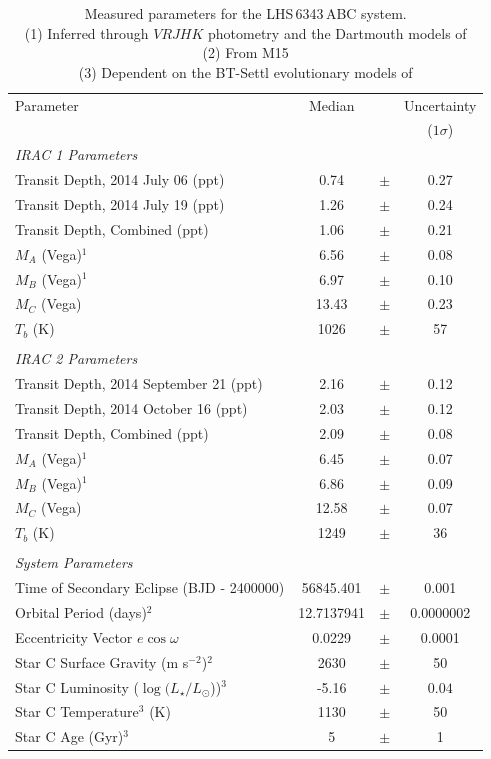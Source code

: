 \begin{table}[hbt!]
\centering
\begin{tabular}{lccc}
\hline
\footnotesize
Parameter & Median    & & Uncertainty \\
 & & & ($1\sigma$) \\
\hline
\textit{IRAC 1 Parameters}\\
Transit Depth, 2014 July 06 (ppt) & 0.74 & $\pm$ & 0.27 \\
Transit Depth, 2014 July 19 (ppt) & 1.26 & $\pm$ & 0.24 \\
Transit Depth, Combined (ppt) & 1.06 & $\pm$ & 0.21 \\
$M_A$ (Vega)$^1$ & 6.56  & $\pm$ & 0.08 \\
$M_B$ (Vega)$^1$ & 6.97 & $\pm$ & 0.10 \\
$M_C$ (Vega)& 13.43 & $\pm$ & 0.23 \\
$T_b$ (K) & 1026 & $\pm$ & 57 \\
\\
\textit{IRAC 2 Parameters}\\
Transit Depth, 2014 September 21 (ppt) & 2.16 &$\pm$  & 0.12 \\
Transit Depth, 2014 October 16 (ppt) & 2.03 & $\pm$ & 0.12 \\
Transit Depth, Combined (ppt) & 2.09 & $\pm$ & 0.08 \\
$M_A$ (Vega)$^1$ & 6.45  & $\pm$ & 0.07 \\
$M_B$ (Vega)$^1$ & 6.86 & $\pm$ & 0.09 \\
$M_C$ (Vega) & 12.58 & $\pm$ & 0.07 \\
$T_b$ (K) & 1249 & $\pm$ & 36 \\
\\
\textit{System Parameters} \\
Time of Secondary Eclipse (BJD - 2400000) & 56845.401 & $\pm$ & 0.001 \\
Orbital Period (days)$^2$ &  12.7137941 & $\pm$ & 0.0000002 \\
Eccentricity Vector $e \cos \omega$ & 0.0229 & $\pm$ & 0.0001 \\
Star C Surface Gravity (m s$^{-2}$)$^2$ & 2630 & $\pm$ & 50  \\
Star C Luminosity ($\log(L_\star /L_\odot$))$^3$  & -5.16 & $\pm$  & $0.04$  \\
Star C Temperature$^3$ (K) & 1130 & $\pm$ & 50 \\
Star C Age (Gyr)$^3$ & 5 & $\pm$ & 1 \\
\hline
\end{tabular}
\caption[Measured parameters for the LHS\,6343\,ABC system]{Measured parameters for the LHS\,6343\,ABC system. \\
(1) Inferred through $VRJHK$ photometry and the Dartmouth models of \citet{Dotter08}  \\
(2) From M15 \\
(3) Dependent on the BT-Settl evolutionary models of \citet{Allard12}}
\label{tab:results-5}
\end{table}

